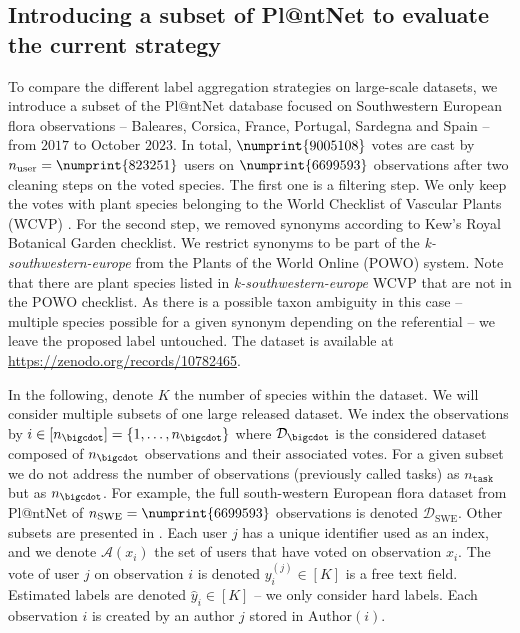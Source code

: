 \subsection{Introducing a subset of Pl@ntNet to evaluate the current strategy}

To compare the different label aggregation strategies on large-scale datasets, we introduce a subset of the Pl@ntNet database focused on Southwestern European flora observations -- Baleares, Corsica, France, Portugal, Sardegna and Spain -- from $2017$ to October $2023$.
In total, $\numprint{9005108}$ votes are cast by $n_\text{user}=\numprint{823251}$ users on $\numprint{6699593}$ observations after two cleaning steps on the voted species.
The first one is a filtering step. We only keep the votes with plant species belonging to the World Checklist of Vascular Plants (WCVP) \citep{govaerts2023world}.
For the second step, we removed synonyms according to Kew's Royal Botanical Garden checklist.
We restrict synonyms to be part of the \emph{k-southwestern-europe} from the Plants of the World Online \citep{powo2024} (POWO) system.
Note that there are plant species listed in \emph{k-southwestern-europe} WCVP that are not in the POWO checklist.
As there is a possible taxon ambiguity in this case -- multiple species possible for a given synonym depending on the referential  -- we leave the proposed label untouched.
The dataset is available at \url{https://zenodo.org/records/10782465}.

In the following, denote $K$ the number of species within the dataset.
We will consider multiple subsets of one large released dataset.
We index the observations by $i\in [n_{\bigcdot}]=\{1,\dots,n_{\bigcdot}\}$ where $\mathcal{D}_{\bigcdot}$ is the considered dataset composed of $n_{\bigcdot}$ observations and their associated votes.
For a given subset we do not address the number of observations (previously called tasks) as  $n_\texttt{task}$ but as $n_{\bigcdot}$.
For example, the full south-western European flora dataset from Pl@ntNet of $n_{\mathrm{SWE}}=\numprint{6699593}$ observations is denoted $\mathcal{D}_{\mathrm{SWE}}$.
Other subsets are presented in .
Each user $j$ has a unique identifier used as an index, and we denote $\mathcal{A}(x_i)$ the set of users that have voted on observation $x_i$.
The vote of user $j$ on observation $i$ is denoted $y_i^{(j)}\in [K]$ is a free text field.
Estimated labels are denoted $\hat y_i \in [K]$ -- we only consider hard labels.
Each observation $i$ is created by an author $j$ stored in $\mathrm{Author}(i)$.

